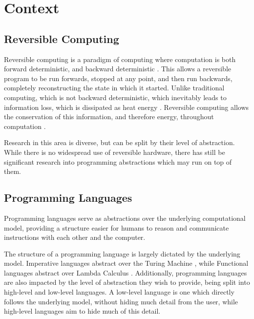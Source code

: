 \chapter{Context}


\section{Reversible Computing}

Reversible computing is a paradigm of computing where computation is both forward deterministic, and backward deterministic \cite{IntroductionToReversibleComputing}. This allows a reversible program to be run forwards, stopped at any point, and then run backwards, completely reconstructing the state in which it started.
Unlike traditional computing, which is not backward deterministic, which inevitably leads to information loss, which is dissipated as heat energy \cite{landauerIrreversibility}. Reversible computing allows the conservation of this information, and therefore energy, throughout computation \cite{Landauer}.

Research in this area is diverse, but can be split by their level of abstraction. While there is no widespread use of reversible hardware, there has still be significant research into programming abstractions which may run on top of them.

\section{Programming Languages}

Programming languages serve as abstractions over the underlying computational model, providing a structure easier for humans to reason and communicate instructions with each other and the computer. 

The structure of a programming language is largely dictated by the underlying model. Imperative languages abstract over the Turing Machine \cite{onComputableNumbers}, while Functional languages abstract over Lambda Calculus \cite{Lambda}. Additionally, programming languages are also impacted by the level of abstraction they wish to provide, being split into high-level and low-level languages. A low-level language is one which directly follows the underlying model, without hiding much detail from the user, while high-level languages aim to hide much of this detail.

